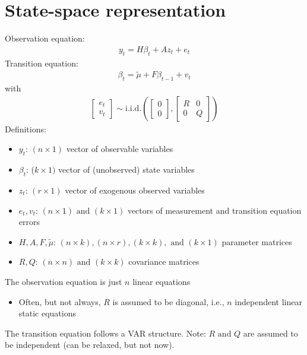 \documentclass[10pt]{article}
\begin{document}
\section{State-space representation}

Observation equation: 
\begin{gather*}
    y_t = H\beta_t + Az_t + e_t
\end{gather*}
Transition equation: 
\begin{gather*}
    \beta_t = \tilde{\mu} + F\beta_{t - 1} + v_t
\end{gather*}
with
\begin{gather*}
    \begin{bmatrix}
        e_t \\
        v_t
    \end{bmatrix}
    \sim \text{i.i.d.} \left(
        \begin{bmatrix}
            0 \\ 0
        \end{bmatrix},
        \begin{bmatrix}
            R & 0 \\
            0 & Q
        \end{bmatrix}
    \right)
\end{gather*}
Definitions: 
\begin{itemize}
    \item $y_t $: $(n\times 1) $ vector of observable variables 
    \item $\beta_t $: ($k\times 1) $ vector of (unobserved) state variables 
    \item $z_t $: $(r \times 1) $ vector of exogenous observed variables 
    \item $e_t, v_t $: $(n\times 1) \text{ and }(k\times 1) $ vectors of measurement and transition equation errors 
    \item $H, A, F, \tilde{\mu} $: $(n\times k), (n\times r), (k\times k), \text{ and }(k\times 1)$ parameter matrices 
    \item $R, Q $: $(n\times n)\text{ and }(k\times k) $ covariance matrices 
\end{itemize}

The observation equation is just $n $ linear equations 
\begin{itemize}
    \item Often, but not always, $R $ is assumed to be diagonal, i.e., $n $ independent linear static equations 
\end{itemize}
The transition equation follows a VAR structure. Note: $R \text{ and } Q $ are assumed to be independent (can be relaxed, but not now).
\newpage 
\end{document}
